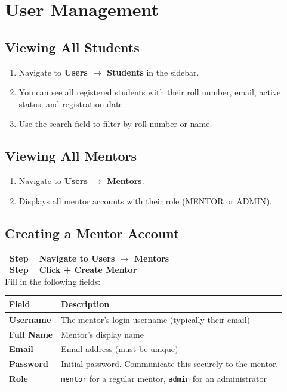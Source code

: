 \documentclass[12pt,a4paper]{article}
\newcounter{stepnum}
\newcommand{\step}[1]{%
  \stepcounter{stepnum}%
  \vspace{6pt}%
  \noindent\colorbox{adminRed}{\color{white}\bfseries\small\ Step \thestepnum\ }%
  \hspace{4pt}\textbf{#1}\\[4pt]%
}
\begin{document}
\section{User Management}

\subsection{Viewing All Students}

\begin{enumerate}
  \item Navigate to \textbf{Users $\rightarrow$ Students} in the sidebar.
  \item You can see all registered students with their roll number, email, active status, and registration date.
  \item Use the search field to filter by roll number or name.
\end{enumerate}

\subsection{Viewing All Mentors}

\begin{enumerate}
  \item Navigate to \textbf{Users $\rightarrow$ Mentors}.
  \item Displays all mentor accounts with their role (MENTOR or ADMIN).
\end{enumerate}

\subsection{Creating a Mentor Account}

\setcounter{stepnum}{0}

\step{Navigate to Users $\rightarrow$ Mentors}

\step{Click \textbf{+ Create Mentor}}
Fill in the following fields:

\begin{center}
\begin{tabularx}{\linewidth}{>{\bfseries}lX}
\toprule
Field & Description \\
\midrule
Username  & The mentor's login username (typically their email) \\
Full Name & Mentor's display name \\
Email     & Email address (must be unique) \\
Password  & Initial password. Communicate this securely to the mentor. \\
Role      & \texttt{mentor} for a regular mentor, \texttt{admin} for an administrator \\
\bottomrule
\end{tabularx}
\end{center}
\end{document}
